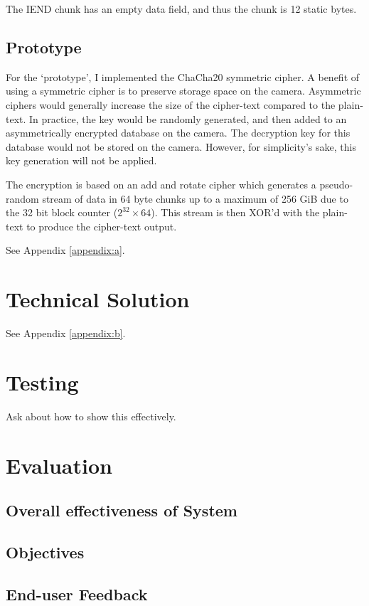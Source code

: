 \documentclass{report}
\begin{document}
The IEND chunk has an empty data field, and thus the chunk is 12 static bytes.

\section{Prototype}

For the `prototype', I implemented the ChaCha20 symmetric cipher. A benefit of using a symmetric cipher is to preserve storage space on the camera. Asymmetric ciphers would generally increase the size of the cipher-text compared to the plain-text. In practice, the key would be randomly generated, and then added to an asymmetrically encrypted database on the camera. The decryption key for this database would not be stored on the camera. However, for simplicity's sake, this key generation will not be applied.

The encryption is based on an add and rotate cipher which generates a pseudo-random stream of data in 64 byte chunks up to a maximum of 256 GiB due to the 32 bit block counter (${2^{32}}\times64$). This stream is then XOR'd with the plain-text to produce the cipher-text output.

See Appendix \ref{appendix:a}.

\chapter{Technical Solution}

See Appendix \ref{appendix:b}.

\chapter{Testing}

Ask about how to show this effectively.

\chapter{Evaluation}

\section{Overall effectiveness of System}

\section{Objectives}

\section{End-user Feedback}
\end{document}
